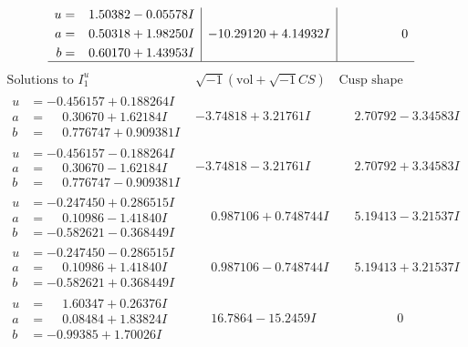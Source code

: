 \documentclass[1p]{elsarticle_modified}
\theoremstyle{definition}
\newcommand{\I}{\sqrt{-1}}
\begin{document}
$$\begin{array}{c|c|c}
\begin{aligned}
u &= \phantom{-}1.50382 - 0.05578 I \\
a &= \phantom{-}0.50318 + 1.98250 I \\
b &= \phantom{-}0.60170 + 1.43953 I\end{aligned}
 & -10.29120 + 4.14932 I & \phantom{-0.000000 } 0\\
 \hline 
 \end{array}$$\newpage$$\begin{array}{c|c|c}  
\text{Solutions to }I^u_{1}& \I (\text{vol} + \sqrt{-1}CS) & \text{Cusp shape}\\
 \hline 
\begin{aligned}
u &= -0.456157 + 0.188264 I \\
a &= \phantom{-}0.30670 + 1.62184 I \\
b &= \phantom{-}0.776747 + 0.909381 I\end{aligned}
 & -3.74818 + 3.21761 I & \phantom{-}2.70792 - 3.34583 I \\ \hline\begin{aligned}
u &= -0.456157 - 0.188264 I \\
a &= \phantom{-}0.30670 - 1.62184 I \\
b &= \phantom{-}0.776747 - 0.909381 I\end{aligned}
 & -3.74818 - 3.21761 I & \phantom{-}2.70792 + 3.34583 I \\ \hline\begin{aligned}
u &= -0.247450 + 0.286515 I \\
a &= \phantom{-}0.10986 - 1.41840 I \\
b &= -0.582621 - 0.368449 I\end{aligned}
 & \phantom{-}0.987106 + 0.748744 I & \phantom{-}5.19413 - 3.21537 I \\ \hline\begin{aligned}
u &= -0.247450 - 0.286515 I \\
a &= \phantom{-}0.10986 + 1.41840 I \\
b &= -0.582621 + 0.368449 I\end{aligned}
 & \phantom{-}0.987106 - 0.748744 I & \phantom{-}5.19413 + 3.21537 I \\ \hline\begin{aligned}
u &= \phantom{-}1.60347 + 0.26376 I \\
a &= \phantom{-}0.08484 + 1.83824 I \\
b &= -0.99385 + 1.70026 I\end{aligned}
 & \phantom{-}16.7864 - 15.2459 I & \phantom{-0.000000 } 0 \\ \hline\begin{aligned}

\end{aligned}
\end{array}$$
\end{document}
